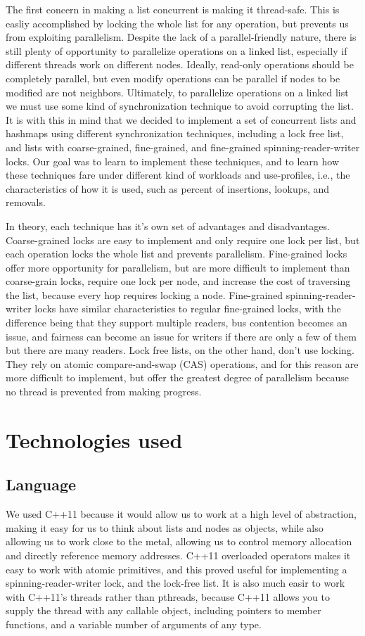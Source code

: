 \documentclass[11pt]{article}
\begin{document}
The first concern in making a list concurrent is making it thread-safe. This is
easliy accomplished by locking the whole list for any operation, but prevents us
from exploiting parallelism. Despite the lack of a parallel-friendly nature,
there is still plenty of opportunity to parallelize operations on a linked list,
especially if different threads work on different nodes. Ideally, read-only
operations should be completely parallel, but even modify operations can be
parallel if nodes to be modified are not neighbors. Ultimately, to parallelize
operations on a linked list we must use some kind of synchronization technique
to avoid corrupting the list. It is with this in mind that we decided to implement
a set of concurrent lists and hashmaps using different synchronization techniques,
including a lock free list, and lists with coarse-grained, fine-grained, and
fine-grained spinning-reader-writer locks. Our goal was to learn to implement
these techniques, and to learn how these techniques fare under different kind of
workloads and use-profiles, i.e., the characteristics of how it is used, such as
percent of insertions, lookups, and removals.

In theory, each technique has it's own set of advantages and disadvantages.
Coarse-grained locks are easy to implement and only require one lock per list,
but each operation locks the whole list and prevents parallelism. Fine-grained
locks offer more opportunity for parallelism, but are more difficult to
implement than coarse-grain locks, require one lock per node, and increase the
cost of traversing the list, because every hop requires locking a node.
Fine-grained spinning-reader-writer locks have similar characteristics to
regular fine-grained locks, with the difference being that they support multiple
readers, bus contention becomes an issue, and fairness can become an issue for
writers if there are only a few of them but there are many readers. Lock free
lists, on the other hand, don't use locking. They rely on atomic
compare-and-swap (CAS) operations, and for this reason are more difficult to
implement, but offer the greatest degree of parallelism because no thread is
prevented from making progress.

\section{Technologies used}
\subsection{Language}
We used C++11 because it would allow us to work at a high level of abstraction,
making it easy for us to think about lists and nodes as objects, while also
allowing us to work close to the metal, allowing us to control memory allocation
and directly reference memory addresses. C++11 overloaded operators makes it
easy to work with atomic primitives, and this proved useful for implementing a
spinning-reader-writer lock, and the lock-free list. It is also much easir to
work with C++11's threads rather than pthreads, because C++11 allows you to
supply the thread with any callable object, including pointers to member
functions, and a variable number of arguments of any type.
\end{document}
